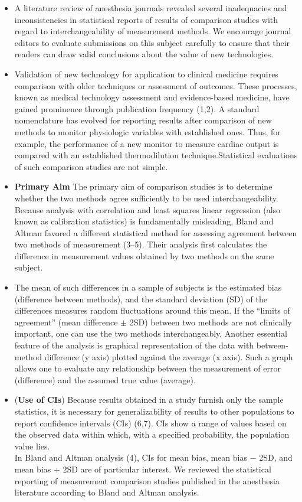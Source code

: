 \documentclass[MAIN.tex]{subfiles}
\begin{document}
	\begin{itemize}
		\item A literature review of anesthesia journals revealed several inadequacies and inconsistencies in statistical reports of results of comparison studies with regard to interchangeability of measurement methods. We encourage journal editors to evaluate submissions on this subject carefully to ensure that their readers can draw valid conclusions about the value of new technologies.
		
		\item Validation of new technology for application to clinical medicine requires comparison with older techniques or assessment of outcomes. These processes, known as medical technology assessment and evidence-based medicine, have gained prominence through publication frequency (1,2). A standard nomenclature has evolved for reporting results after comparison of new methods to monitor physiologic variables with established ones. Thus, for example, the performance of a new monitor to measure cardiac output is compared with an established thermodilution technique.Statistical evaluations of such comparison studies are not simple. 
		
		\item \textbf{Primary Aim} The primary aim of comparison studies is to determine whether the two methods agree sufficiently to be used interchangeability. Because analysis with correlation and least squares linear regression (also known as calibration statistics) is fundamentally misleading, Bland and Altman favored a different statistical method for assessing agreement between two methods of measurement (3–5). Their analysis first calculates the difference in measurement values obtained by two methods on the same subject. 
		
		\item The mean of such differences in a sample of subjects is the estimated bias (difference between methods), and the standard deviation (SD) of the differences measures random fluctuations around this mean. If the “limits of agreement” (mean difference $\pm$ 2SD) between two methods are not clinically important, one can use the two methods interchangeably. Another essential feature of the analysis is graphical representation of the data with between-method difference (y axis) plotted against the average (x axis). Such a graph allows one to evaluate any relationship between the measurement of error (difference) and the assumed true value (average). 
		
		\item (\textbf{Use of CIs}) Because results obtained in a study furnish only the sample statistics, it is necessary for generalizability of results to other populations to report confidence intervals (CIs) (6,7). CIs show a range of values based on the observed data within which, with a specified probability, the population value lies. \\ In Bland and Altman analysis (4), CIs for mean bias, mean bias − 2SD, and mean bias + 2SD are of particular interest. We reviewed the statistical reporting of measurement comparison studies published in the anesthesia literature according to Bland and Altman analysis.
	\end{itemize}
\end{document}
